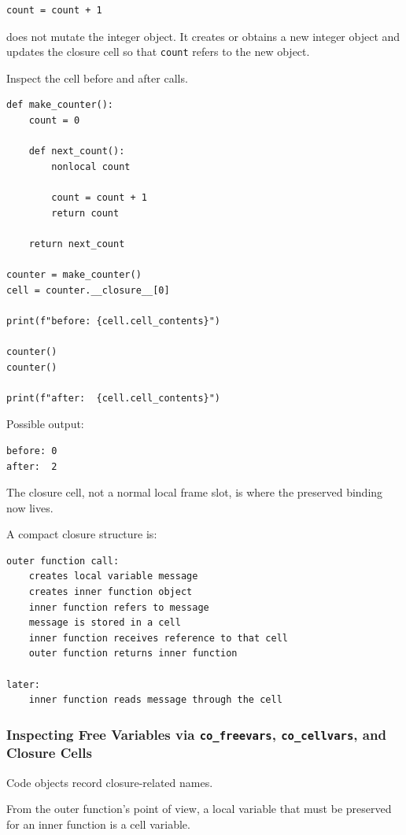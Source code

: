 \begin{verbatim}
count = count + 1
\end{verbatim}

does not mutate the integer object. It creates or obtains a new integer object and updates the closure cell so that \texttt{count} refers to the new object.

Inspect the cell before and after calls.

\begin{verbatim}
def make_counter():
    count = 0

    def next_count():
        nonlocal count

        count = count + 1
        return count

    return next_count

counter = make_counter()
cell = counter.__closure__[0]

print(f"before: {cell.cell_contents}")

counter()
counter()

print(f"after:  {cell.cell_contents}")
\end{verbatim}

Possible output:

\begin{verbatim}
before: 0
after:  2
\end{verbatim}

The closure cell, not a normal local frame slot, is where the preserved binding now lives.

A compact closure structure is:

\begin{verbatim}
outer function call:
    creates local variable message
    creates inner function object
    inner function refers to message
    message is stored in a cell
    inner function receives reference to that cell
    outer function returns inner function

later:
    inner function reads message through the cell
\end{verbatim}

\subsubsection{Inspecting Free Variables via \texttt{co\_freevars}, \texttt{co\_cellvars}, and Closure Cells}

Code objects record closure-related names.

From the outer function's point of view, a local variable that must be preserved for an inner function is a cell variable.

